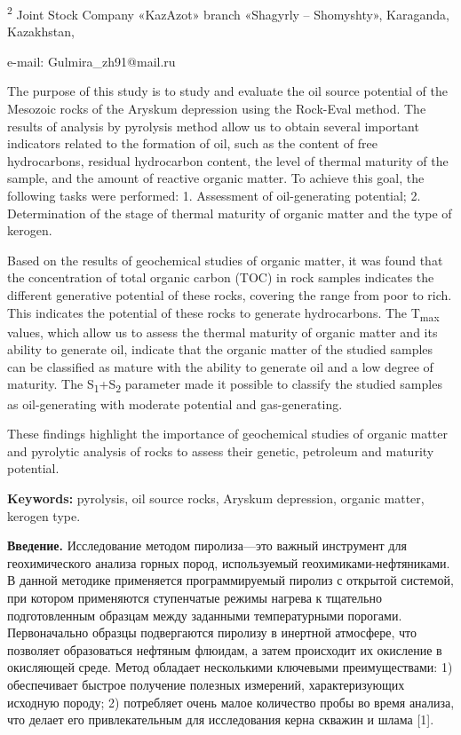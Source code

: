 \textsuperscript{2} Joint Stock Company «KazAzot» branch «Shagyrly --
Shomyshty», Karaganda, Kazakhstan,

e-mail: Gulmira\_zh91@mail.ru

The purpose of this study is to study and evaluate the oil source
potential of the Mesozoic rocks of the Aryskum depression using the
Rock-Eval method. The results of analysis by pyrolysis method allow us
to obtain several important indicators related to the formation of oil,
such as the content of free hydrocarbons, residual hydrocarbon content,
the level of thermal maturity of the sample, and the amount of reactive
organic matter. To achieve this goal, the following tasks were
performed: 1. Assessment of oil-generating potential; 2. Determination
of the stage of thermal maturity of organic matter and the type of
kerogen.

Based on the results of geochemical studies of organic matter, it was
found that the concentration of total organic carbon (TOC) in rock
samples indicates the different generative potential of these rocks,
covering the range from poor to rich. This indicates the potential of
these rocks to generate hydrocarbons. The T\textsubscript{max} values,
which allow us to assess the thermal maturity of organic matter and its
ability to generate oil, indicate that the organic matter of the studied
samples can be classified as mature with the ability to generate oil and
a low degree of maturity. The S\textsubscript{1}+S\textsubscript{2}
parameter made it possible to classify the studied samples as
oil-generating with moderate potential and gas-generating.

These findings highlight the importance of geochemical studies of
organic matter and pyrolytic analysis of rocks to assess their genetic,
petroleum and maturity potential.

{\bfseries Keywords:} pyrolysis, oil source rocks, Aryskum depression,
organic matter, kerogen type.

{\bfseries Введение.} Исследование методом пиролиза---это важный инструмент
для геохимического анализа горных пород, используемый
геохимиками-нефтяниками. В данной методике применяется программируемый
пиролиз с открытой системой, при котором применяются ступенчатые режимы
нагрева к тщательно подготовленным образцам между заданными
температурными порогами. Первоначально образцы подвергаются пиролизу в
инертной атмосфере, что позволяет образоваться нефтяным флюидам, а затем
происходит их окисление в окисляющей среде. Метод обладает несколькими
ключевыми преимуществами: 1) обеспечивает быстрое получение полезных
измерений, характеризующих исходную породу; 2) потребляет очень малое
количество пробы во время анализа, что делает его привлекательным для
исследования керна скважин и шлама {[}1{]}.

